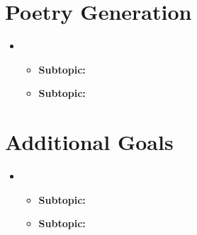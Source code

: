 \section{Poetry Generation}
\medskip
\begin{itemize}

    \item {}

    \begin{itemize}
    \item \textbf{Subtopic:} 
    \item \textbf{Subtopic:} 
    \end{itemize}
    

\end{itemize}








\section{Additional Goals}
\medskip
\begin{itemize}

    \item {}

    \begin{itemize}
    \item \textbf{Subtopic:} 
    \item \textbf{Subtopic:} 
    \end{itemize}

\end{itemize}

